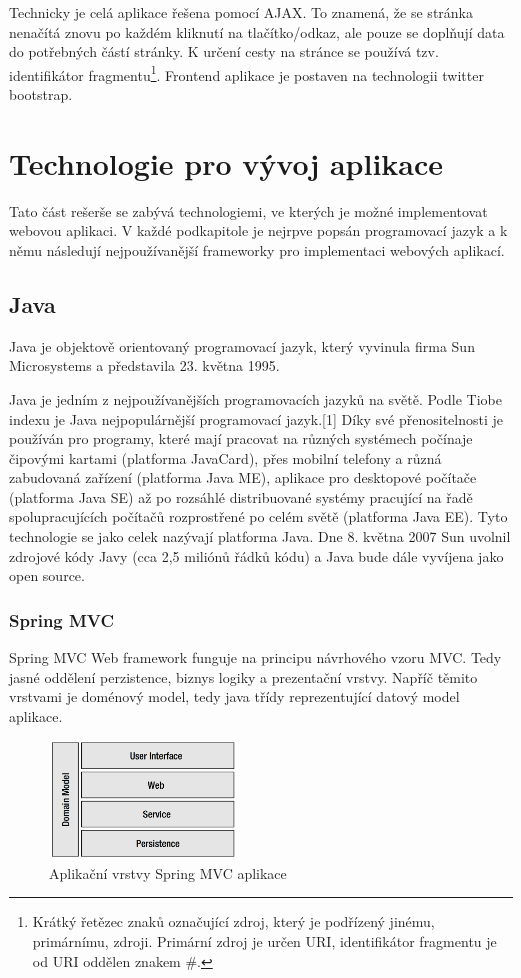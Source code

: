 Technicky je celá aplikace řešena pomocí AJAX. To znamená, že se stránka nenačítá znovu po každém kliknutí na tlačítko/odkaz, ale pouze se doplňují data do potřebných částí stránky. K určení cesty na stránce se používá tzv. identifikátor fragmentu\footnote{Krátký řetězec znaků označující zdroj, který je podřízený jinému, primárnímu, zdroji. Primární zdroj je určen URI, identifikátor fragmentu je od URI oddělen znakem \#.}. Frontend aplikace je postaven na technologii twitter bootstrap.

\section{Technologie pro vývoj aplikace}
Tato část rešerše se zabývá technologiemi, ve kterých je možné implementovat webovou aplikaci. V každé podkapitole je nejrpve popsán programovací jazyk a k němu následují nejpoužívanější frameworky pro implementaci webových aplikací.
\subsection{Java}
Java je objektově orientovaný programovací jazyk, který vyvinula firma Sun Microsystems a představila 23. května 1995.

Java je jedním z nejpoužívanějších programovacích jazyků na světě. Podle Tiobe indexu je Java nejpopulárnější programovací jazyk.[1] Díky své přenositelnosti je používán pro programy, které mají pracovat na různých systémech počínaje čipovými kartami (platforma JavaCard), přes mobilní telefony a různá zabudovaná zařízení (platforma Java ME), aplikace pro desktopové počítače (platforma Java SE) až po rozsáhlé distribuované systémy pracující na řadě spolupracujících počítačů rozprostřené po celém světě (platforma Java EE). Tyto technologie se jako celek nazývají platforma Java. Dne 8. května 2007 Sun uvolnil zdrojové kódy Javy (cca 2,5 miliónů řádků kódu) a Java bude dále vyvíjena jako open source.
\subsubsection{Spring MVC}
Spring MVC Web framework funguje na principu návrhového vzoru MVC. Tedy jasné oddělení perzistence, biznys logiky a prezentační vrstvy. Napříč těmito vrstvami je doménový model, tedy java třídy reprezentující datový model aplikace\cite{liu2006research}.

\begin{figure}[htb]
\begin{center}
\includegraphics[width=50mm]{./pictures/spring-mvc-layers.png}
\caption{Aplikační vrstvy Spring MVC aplikace \cite{liu2006research}}
\label{fig:spring-mvc-layers}
\end{center}
\end{figure}

